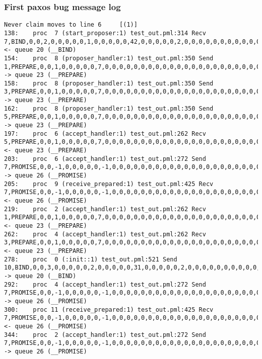 \subsubsection{First paxos bug message log}
\begin{lstlisting}[xleftmargin=.01\linewidth, xrightmargin=0.01\linewidth, caption={Message passing caused by the proposer's protocol bug.}, label={lst:paxos_bug}]
    Never claim moves to line 6     [(1)]
138:    proc  7 (start_proposer:1) test_out.pml:314 Recv 7,BIND,0,0,2,0,0,0,0,0,1,0,0,0,0,0,42,0,0,0,0,0,2,0,0,0,0,0,0,0,0,0,0,0,0,0,0,0        <- queue 20 (__BIND)
154:    proc  8 (proposer_handler:1) test_out.pml:350 Send 1,PREPARE,0,0,1,0,0,0,0,0,7,0,0,0,0,0,0,0,0,0,0,0,0,0,0,0,0,0,0,0,0,0,0,0,0,0,0,0    -> queue 23 (__PREPARE)
158:    proc  8 (proposer_handler:1) test_out.pml:350 Send 3,PREPARE,0,0,1,0,0,0,0,0,7,0,0,0,0,0,0,0,0,0,0,0,0,0,0,0,0,0,0,0,0,0,0,0,0,0,0,0    -> queue 23 (__PREPARE)
162:    proc  8 (proposer_handler:1) test_out.pml:350 Send 5,PREPARE,0,0,1,0,0,0,0,0,7,0,0,0,0,0,0,0,0,0,0,0,0,0,0,0,0,0,0,0,0,0,0,0,0,0,0,0    -> queue 23 (__PREPARE)
197:    proc  6 (accept_handler:1) test_out.pml:262 Recv 5,PREPARE,0,0,1,0,0,0,0,0,7,0,0,0,0,0,0,0,0,0,0,0,0,0,0,0,0,0,0,0,0,0,0,0,0,0,0,0      <- queue 23 (__PREPARE)
203:    proc  6 (accept_handler:1) test_out.pml:272 Send 7,PROMISE,0,0,-1,0,0,0,0,0,-1,0,0,0,0,0,0,0,0,0,0,0,0,0,0,0,0,0,0,0,0,0,0,0,0,0,0,0    -> queue 26 (__PROMISE)
205:    proc  9 (receive_prepared:1) test_out.pml:425 Recv 7,PROMISE,0,0,-1,0,0,0,0,0,-1,0,0,0,0,0,0,0,0,0,0,0,0,0,0,0,0,0,0,0,0,0,0,0,0,0,0,0  <- queue 26 (__PROMISE)
219:    proc  2 (accept_handler:1) test_out.pml:262 Recv 1,PREPARE,0,0,1,0,0,0,0,0,7,0,0,0,0,0,0,0,0,0,0,0,0,0,0,0,0,0,0,0,0,0,0,0,0,0,0,0      <- queue 23 (__PREPARE)
262:    proc  4 (accept_handler:1) test_out.pml:262 Recv 3,PREPARE,0,0,1,0,0,0,0,0,7,0,0,0,0,0,0,0,0,0,0,0,0,0,0,0,0,0,0,0,0,0,0,0,0,0,0,0      <- queue 23 (__PREPARE)
278:    proc  0 (:init::1) test_out.pml:521 Send 10,BIND,0,0,3,0,0,0,0,0,2,0,0,0,0,0,31,0,0,0,0,0,2,0,0,0,0,0,0,0,0,0,0,0,0,0,0,0       -> queue 20 (__BIND)
292:    proc  4 (accept_handler:1) test_out.pml:272 Send 7,PROMISE,0,0,-1,0,0,0,0,0,-1,0,0,0,0,0,0,0,0,0,0,0,0,0,0,0,0,0,0,0,0,0,0,0,0,0,0,0    -> queue 26 (__PROMISE)
300:    proc 11 (receive_prepared:1) test_out.pml:425 Recv 7,PROMISE,0,0,-1,0,0,0,0,0,-1,0,0,0,0,0,0,0,0,0,0,0,0,0,0,0,0,0,0,0,0,0,0,0,0,0,0,0  <- queue 26 (__PROMISE)
344:    proc  2 (accept_handler:1) test_out.pml:272 Send 7,PROMISE,0,0,-1,0,0,0,0,0,-1,0,0,0,0,0,0,0,0,0,0,0,0,0,0,0,0,0,0,0,0,0,0,0,0,0,0,0    -> queue 26 (__PROMISE)

\end{lstlisting}
